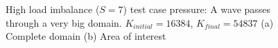 \begin{figure}[H]
	\centering
	\hfill
	\caption{High load imbalance (\(S = 7\)) test case pressure: A wave passes through a very big domain. \(K_{initial} = 16384\), \(K_{final} = 54837\) (a) Complete domain (b) Area of interest}\label{fig:load_imbalance_case_high_p}
\end{figure}

